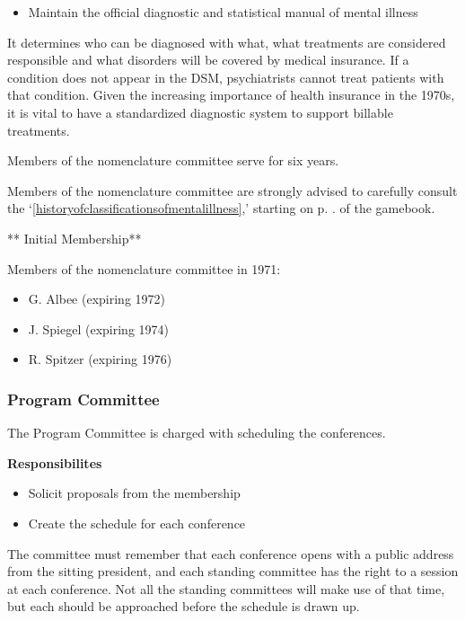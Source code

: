 \begin{itemize}
\item Maintain the official diagnostic and statistical manual of mental illness

\end{itemize}

It determines who can be diagnosed with what, what treatments are considered responsible and what disorders will be covered by medical insurance. If a condition does not appear in the DSM, psychiatrists cannot treat patients with that condition. Given the increasing importance of health insurance in the 1970s, it is vital to have a standardized diagnostic system to support billable treatments.

Members of the nomenclature committee serve for six years.

Members of the nomenclature committee are strongly advised to carefully consult the `\ref{historyofclassificationsofmentalillness},' starting on p. \pageref{historyofclassificationsofmentalillness}. of the gamebook.

** Initial Membership**

Members of the nomenclature committee in 1971:

\begin{itemize}
\item G. Albee (expiring 1972)

\item J. Spiegel (expiring 1974)

\item R. Spitzer (expiring 1976)

\end{itemize}

\subsubsection{Program Committee}
\label{programcommittee}

The Program Committee is charged with scheduling the conferences. 

\textbf{Responsibilites}

\begin{itemize}
\item Solicit proposals from the membership

\item Create the schedule for each conference

\end{itemize}

The committee must remember that each conference opens with a public address from the sitting president, and each standing committee has the right to a session at each conference. Not all the standing committees will make use of that time, but each should be approached before the schedule is drawn up.

